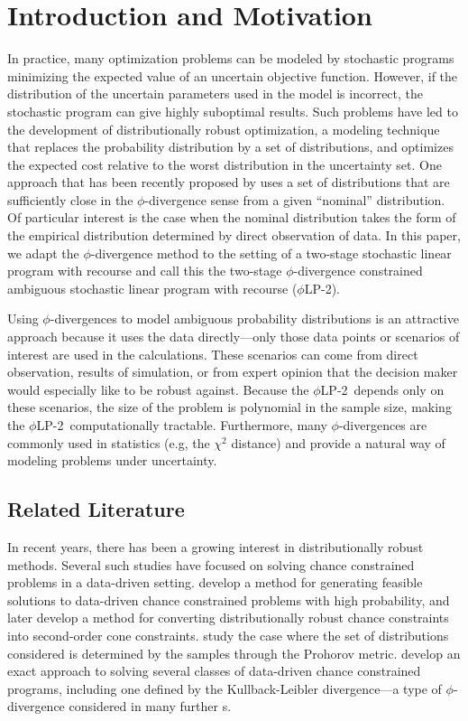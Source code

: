 \documentclass[opre,nonblindrev]{informs3} %
\newcommand{\plp}{$\phi$LP-2}
\begin{document}
\section{Introduction and Motivation}

In practice, many optimization problems can be modeled by stochastic programs minimizing the expected value of an uncertain objective function.
However, if the distribution of the uncertain parameters used in the model is incorrect, the stochastic program can give highly suboptimal results.
Such problems have led to the development of distributionally robust optimization, a modeling technique that replaces the probability distribution by a set of distributions, and optimizes the expected cost relative to the worst distribution in the uncertainty set.
One approach that has been recently proposed by \cite{bental2011robust} uses a set of distributions that are sufficiently close in the $\phi$-divergence sense from a given ``nominal'' distribution. 
Of particular interest is the case when the nominal distribution takes the form of the empirical distribution determined by direct observation of data.
In this paper, we adapt the $\phi$-divergence method to the setting of a two-stage stochastic linear program with recourse and call this the two-stage $\phi$-divergence constrained ambiguous stochastic linear program with recourse (\plp).

Using $\phi$-divergences to model ambiguous probability distributions is an attractive approach because it uses the data directly---only those data points or scenarios of interest are used in the calculations.
These scenarios can come from direct observation, results of simulation, or from expert opinion that the decision maker would especially like to be robust against.
Because the \plp\ depends only on these scenarios, the size of the problem is polynomial in the sample size, making the \plp\ computationally tractable.
Furthermore, many $\phi$-divergences are commonly used in statistics (e.g, the $\chi^2$ distance) and provide a natural way of modeling problems under uncertainty. 

\subsection{Related Literature}

In recent years, there has been a growing interest in distributionally robust methods.
Several such studies have focused on solving chance constrained problems in a data-driven setting.
\cite{calafiore2005uncertain} develop a method for generating feasible solutions to data-driven chance constrained problems with high probability, and later \cite{calafiore2006distributionally} develop a method for converting distributionally robust chance constraints into second-order cone constraints.
\cite{erdogan2006ambiguous} study the case where the set of distributions considered is determined by the samples through the Prohorov metric.
\cite{jiang2012data} develop an exact approach to solving several classes of data-driven chance constrained programs, including one defined by the Kullback-Leibler divergence---a type of $\phi$-divergence considered in many further s.
\end{document}
